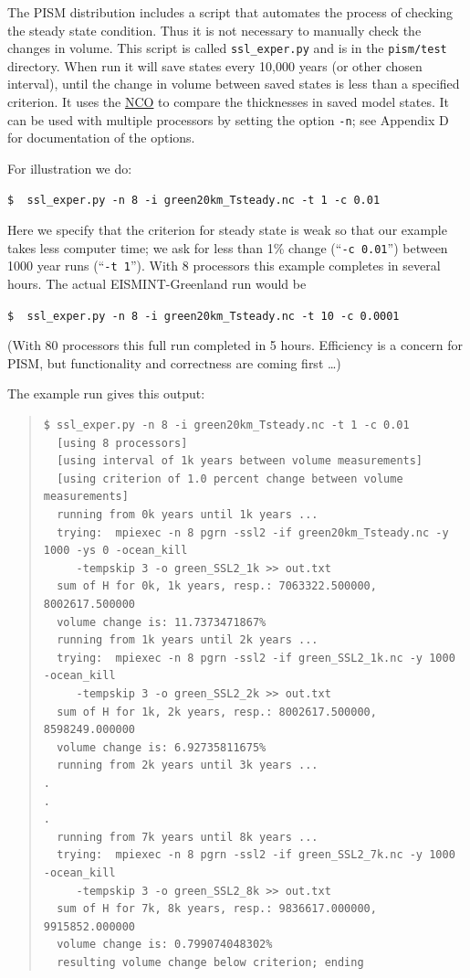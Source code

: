 \documentclass[11pt,final]{amsart}
\begin{document}
The PISM distribution includes a script that automates the process of checking the steady state condition.  Thus it is not necessary to manually check the changes in volume.  This script is called \verb|ssl_exper.py| and is in the \verb|pism/test| directory.  When run it will save states every 10,000 years (or other chosen interval), until the change in volume between saved states is less than a specified criterion.  It uses the \href{http://nco.sourceforge.net/}{NCO} to compare the thicknesses in saved model states.  It can be used with multiple processors by setting the option \verb|-n|; see Appendix D for documentation of the options.

For illustration we do:

\verb|$  ssl_exper.py -n 8 -i green20km_Tsteady.nc -t 1 -c 0.01|

\noindent Here we specify that the criterion for steady state is weak so that our example takes less computer time; we ask for less than 1\% change (``\verb|-c 0.01|'') between 1000 year runs (``\verb|-t 1|'').  With 8 processors this example completes in several hours.  The actual EISMINT-Greenland run would be

\verb|$  ssl_exper.py -n 8 -i green20km_Tsteady.nc -t 10 -c 0.0001|

(With 80 processors this full run completed in 5 hours.  Efficiency is a concern for PISM, but functionality and correctness are coming first \dots)  

The example run gives this output:

\small\begin{quote}\begin{verbatim}
$ ssl_exper.py -n 8 -i green20km_Tsteady.nc -t 1 -c 0.01
  [using 8 processors]
  [using interval of 1k years between volume measurements]
  [using criterion of 1.0 percent change between volume measurements]
  running from 0k years until 1k years ...
  trying:  mpiexec -n 8 pgrn -ssl2 -if green20km_Tsteady.nc -y 1000 -ys 0 -ocean_kill
     -tempskip 3 -o green_SSL2_1k >> out.txt
  sum of H for 0k, 1k years, resp.: 7063322.500000, 8002617.500000
  volume change is: 11.7373471867%
  running from 1k years until 2k years ...
  trying:  mpiexec -n 8 pgrn -ssl2 -if green_SSL2_1k.nc -y 1000 -ocean_kill
     -tempskip 3 -o green_SSL2_2k >> out.txt
  sum of H for 1k, 2k years, resp.: 8002617.500000, 8598249.000000
  volume change is: 6.92735811675%
  running from 2k years until 3k years ...
.
.
.
  running from 7k years until 8k years ...
  trying:  mpiexec -n 8 pgrn -ssl2 -if green_SSL2_7k.nc -y 1000 -ocean_kill
     -tempskip 3 -o green_SSL2_8k >> out.txt
  sum of H for 7k, 8k years, resp.: 9836617.000000, 9915852.000000
  volume change is: 0.799074048302%
  resulting volume change below criterion; ending
\end{verbatim}
\end{quote}\normalsize
\end{document}
